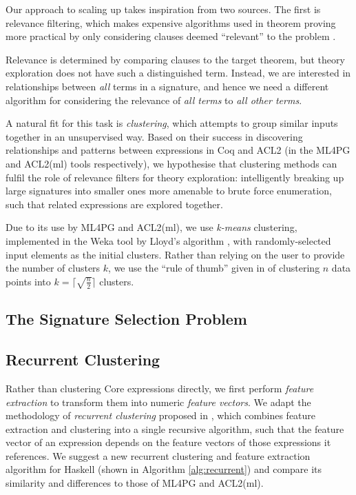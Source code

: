 Our approach to scaling up \qspec{} takes inspiration from two sources. The
first is relevance filtering, which makes expensive algorithms used in theorem
proving more practical by only considering clauses deemed ``relevant'' to the
problem \cite{meng2009lightweight}.

Relevance is determined by comparing clauses to the target theorem, but theory
exploration does not have such a distinguished term. Instead, we are interested
in relationships between \emph{all} terms in a signature, and hence we need a
different algorithm for considering the relevance of \emph{all terms} to
\emph{all other terms}.

A natural fit for this task is \emph{clustering}, which attempts to group
similar inputs together in an unsupervised way. Based on their success in
discovering relationships and patterns between expressions in Coq and ACL2 (in
the ML4PG and ACL2(ml) tools respectively), we hypothesise that clustering
methods can fulfil the role of relevance filters for theory exploration:
intelligently breaking up large signatures into smaller ones more amenable to
brute force enumeration, such that related expressions are explored together.

Due to its use by ML4PG and ACL2(ml), we use \emph{k-means} clustering,
implemented in the Weka tool \cite{Holmes.Donkin.Witten:1994} by Lloyd's
algorithm \cite{lloyd1982least}, with randomly-selected input elements as the
initial clusters. Rather than relying on the user to provide the number of
clusters $k$, we use the ``rule of thumb'' given in
\cite[pp. 365]{mardia1979multivariate} of clustering $n$ data points into
$k = \lceil \sqrt{\frac{n}{2}} \rceil$ clusters.

\subsection{The Signature Selection Problem}
\label{sec:sigselect}


\subsection{Recurrent Clustering}
\label{sec:recurrentclustering}

Rather than clustering Core expressions directly, we first perform \emph{feature
  extraction} to transform them into numeric \emph{feature vectors}. We adapt
the methodology of \emph{recurrent clustering} proposed in
\cite{DBLP:journals/corr/HerasK14} \cite{heras2013proof}, which combines feature
extraction and clustering into a single recursive algorithm, such that the
feature vector of an expression depends on the feature vectors of those
expressions it references. We suggest a new recurrent clustering and feature
extraction algorithm for Haskell (shown in Algorithm \ref{alg:recurrent}) and
compare its similarity and differences to those of ML4PG and ACL2(ml).

